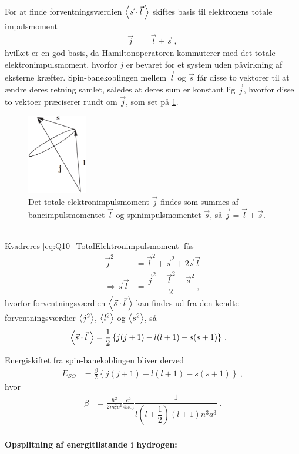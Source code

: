 For at finde forventningsværdien $\Braket{\Vec{s} \cdot \Vec{l} \: }$ skiftes basis til elektronens totale impulsmoment
\begin{align} \label{eq:Q10_TotalElektronimpulsmoment}
    \Vec{j} &= \Vec{l} + \Vec{s} \: ,
\end{align}
hvilket er en god basis, da Hamiltonoperatoren kommuterer med det totale elektronimpulsmoment, hvorfor $j$ er bevaret for et system uden påvirkning af eksterne kræfter. Spin-banekoblingen mellem $\Vec{l}$ og $\Vec{s}$ får disse to vektorer til at ændre deres retning samlet, således at deres sum er konstant lig $\Vec{j}$, hvorfor disse to vektoer præciserer rundt om $\Vec{j}$, som set på \cref{fig:Q10_TotalElektronimpulsmoment}.
\begin{figure}[!h]
    \centering
    \includegraphics[width=0.23\textwidth]{Q10/images/AtomicQuantumNumberJ.PNG}
    \caption{Det totale elektronimpulsmoment $\Vec{j}$ findes som summes af baneimpulsmomentet $\Vec{l}$ og spinimpulsmomentet $\Vec{s}$, så $\Vec{j} = \Vec{l} + \Vec{s}$.}
    \label{fig:Q10_TotalElektronimpulsmoment}
\end{figure}\\
Kvadreres \cref{eq:Q10_TotalElektronimpulsmoment} fås
\begin{align}
    \Vec{j}^2 &= \Vec{l}^2 + \Vec{s}^2 + 2\Vec{s}\Vec{l} \nonumber\\
    \Rightarrow \Vec{s}\Vec{l} &= \dfrac{\Vec{j}^2 - \Vec{l}^2 - \Vec{s}^2}{2} \: ,
\end{align}
hvorfor forventningsværdien $\Braket{\Vec{s} \cdot \Vec{l} \: }$ kan findes ud fra den kendte forventningsværdier $\Braket{j^2}$, $\Braket{l^2}$ og $\Braket{s^2}$, så
\begin{align}
    \Braket{\Vec{s} \cdot \Vec{l} \: } &= \frac{1}{2}\left\{j(j+1) - l(l+1) - s(s+1)\right\} \: .
\end{align}

Energiskiftet fra spin-banekoblingen bliver derved
\begin{align} \label{eq:Q10_EnergiskiftSpinOrbitForHydrogen}
    E_{SO} &= \frac{\beta}{2} \left\{j(j+1) - l(l+1) - s(s+1)\right\} \: ,
\end{align}
hvor
\begin{align}
    \beta &= \frac{\hbar^2}{2m_e^2c^2} \frac{e^2}{4\pi\epsilon_0} \dfrac{1}{l\left(l+\dfrac{1}{2}\right)\left(l + 1\right) n^3a^3} \: .
\end{align}

\paragraph{Opsplitning af energitilstande i hydrogen:}